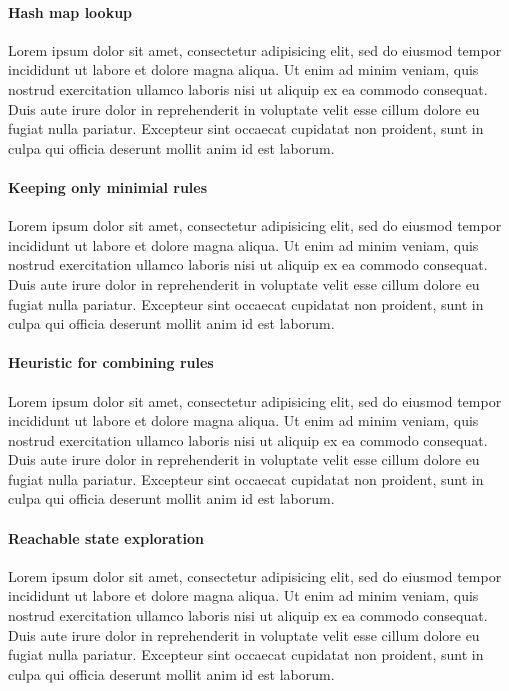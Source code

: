 \paragraph{Hash map lookup}

Lorem ipsum dolor sit amet, consectetur adipisicing elit, sed do eiusmod tempor incididunt ut labore et dolore magna aliqua. Ut enim ad minim veniam, quis nostrud exercitation ullamco laboris nisi ut aliquip ex ea commodo consequat. Duis aute irure dolor in reprehenderit in voluptate velit esse cillum dolore eu fugiat nulla pariatur. Excepteur sint occaecat cupidatat non proident, sunt in culpa qui officia deserunt mollit anim id est laborum.

\paragraph{Keeping only minimial rules}

Lorem ipsum dolor sit amet, consectetur adipisicing elit, sed do eiusmod tempor incididunt ut labore et dolore magna aliqua. Ut enim ad minim veniam, quis nostrud exercitation ullamco laboris nisi ut aliquip ex ea commodo consequat. Duis aute irure dolor in reprehenderit in voluptate velit esse cillum dolore eu fugiat nulla pariatur. Excepteur sint occaecat cupidatat non proident, sunt in culpa qui officia deserunt mollit anim id est laborum.

\paragraph{Heuristic for combining rules}

Lorem ipsum dolor sit amet, consectetur adipisicing elit, sed do eiusmod tempor incididunt ut labore et dolore magna aliqua. Ut enim ad minim veniam, quis nostrud exercitation ullamco laboris nisi ut aliquip ex ea commodo consequat. Duis aute irure dolor in reprehenderit in voluptate velit esse cillum dolore eu fugiat nulla pariatur. Excepteur sint occaecat cupidatat non proident, sunt in culpa qui officia deserunt mollit anim id est laborum.

\paragraph{Reachable state exploration}

Lorem ipsum dolor sit amet, consectetur adipisicing elit, sed do eiusmod tempor incididunt ut labore et dolore magna aliqua. Ut enim ad minim veniam, quis nostrud exercitation ullamco laboris nisi ut aliquip ex ea commodo consequat. Duis aute irure dolor in reprehenderit in voluptate velit esse cillum dolore eu fugiat nulla pariatur. Excepteur sint occaecat cupidatat non proident, sunt in culpa qui officia deserunt mollit anim id est laborum.

